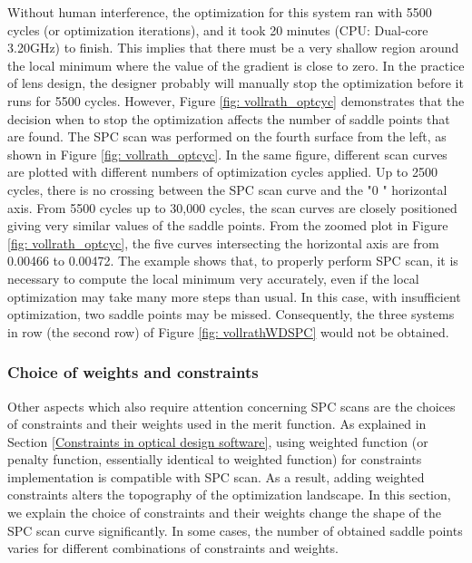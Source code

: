 Without human interference, the optimization for this system ran with 5500 cycles (or optimization iterations), and it took 20 minutes (CPU: Dual-core 3.20GHz) to finish. This implies that there must be a very shallow region around the local minimum where the value of the gradient is close to zero. In the practice of lens design, the designer probably will manually stop the optimization before it runs for 5500 cycles. However, Figure \ref{fig: vollrath_optcyc} demonstrates that the decision when to stop the optimization affects the number of saddle points that are found. The SPC scan was performed on the fourth surface from the left, as shown in Figure \ref{fig: vollrath_optcyc}. In the same figure, different scan curves are plotted with different numbers of optimization cycles applied. Up to 2500 cycles, there is no crossing between the SPC scan curve and the "$0$ " horizontal axis. From 5500 cycles up to 30,000 cycles, the scan curves are closely positioned giving very similar values of the saddle points. From the zoomed plot in Figure \ref{fig: vollrath_optcyc}, the five curves intersecting the horizontal axis are from 0.00466 to 0.00472. The example shows that, to properly perform SPC scan, it is necessary to compute the local minimum very accurately, even if the local optimization may take many more steps than usual. In this case, with insufficient optimization, two saddle points may be missed. Consequently, the three systems in row  (the second row) of Figure \ref{fig: vollrathWDSPC} would not be obtained. 

\subsubsection{Choice of weights and constraints}
Other aspects which also require attention concerning SPC scans are the choices of constraints and their weights used in the merit function. As explained in Section \ref{Constraints in optical design software}, using weighted function (or penalty function, essentially identical to weighted function) for constraints implementation is compatible with SPC scan. As a result, adding weighted constraints alters the topography of the optimization landscape.  In this section, we explain the choice of constraints and their weights change the shape of the SPC scan curve significantly. In some cases, the number of obtained saddle points varies for different combinations of constraints and weights. 


